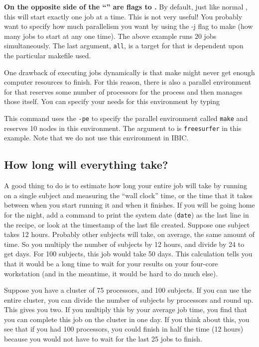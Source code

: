 \textbf{On the opposite side of the ``\dd{}'' are flags to \maken.} By default, just like normal \maken, this will start exactly one job at a time. This is not very useful! You probably want to specify how much parallelism you want by using the -j flag to make (how many jobs to start at any one time). The above example runs 20 jobs simultaneously. The last argument, \texttt{all}, is a target for \maken{} that is dependent upon the particular makefile used.

One drawback of executing jobs dynamically is that make might never get enough computer resources to finish. For this reason, there is also a parallel environment for \maken{} that reserves some number of processors for the \maken{} process and then manages those itself. You can specify your needs for this environment by typing

This command uses the \texttt{-pe} to specify the parallel environment called \texttt{make} and reserves 10 nodes in this environment. The argument to \maken{} is \texttt{freesurfer} in this example. Note that we do not use this environment in IBIC.

\subsection{How long will everything take?}

A good thing to do is to estimate how long your entire job will take by running \maken{} on a single subject and measuring the ``wall clock'' time, or the time that it takes between when you start running it and when it finishes. If you will be going home for the night, add a command to print the system date (\texttt{date}) as the last line in the recipe, or look at the timestamp of the last file created. Suppose one subject takes 12 hours. Probably other subjects will take, on average, the same amount of time. So you multiply the number of subjects by 12 hours, and divide by 24 to get days. For 100 subjects, this job would take 50 days. This calculation tells you that it would be a long time to wait for your results on your four-core workstation (and in the meantime, it would be hard to do much else). 

Suppose you have a cluster of 75 processors, and 100 subjects. If you can use the entire cluster, you can divide the number of subjects by processors and round up. This gives you two. If you multiply this by your average job time, you find that you can complete this job on the cluster in one day. If you think about this, you see that if you had 100 processors, you could finish in half the time (12 hours) because you would not have to wait for the last 25 jobs to finish.

